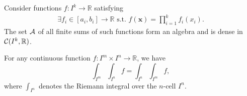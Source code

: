 \begin{lem}
  \label{lem:factoredFunc}
  Consider functions $f: I^k\rightarrow \mathbb{R}$
  satisfying
  \begin{equation}
    \label{eq:factoredFunc}
    \begin{array}{l}
      \exists f_i\in[a_i,b_i]\rightarrow \mathbb{R} \text{ s.t. }
      f(\mathbf{x}) = \prod_{i=1}^k f_i(x_i).
    \end{array}
  \end{equation}
  The set ${\cal A}$ of all finite sums of such functions
  form an algebra and is dense in ${\cal C}(I^k,\mathbb{R})$.
\end{lem}

\begin{coro}%
  \label{coro:FubiniOnKcell}
  For any continuous function $f: I^m\times I^n \rightarrow \mathbb{R}$,
  we have
  \begin{equation}
    \label{eq:FubiniOnKcell}
    \int_{I^m} \int_{I^n} f = \int_{I^n} \int_{I^m} f,
  \end{equation}
  where $\int_{I^n}$ denotes the Riemann integral
  over the $n$-cell $I^n$.
\end{coro}



